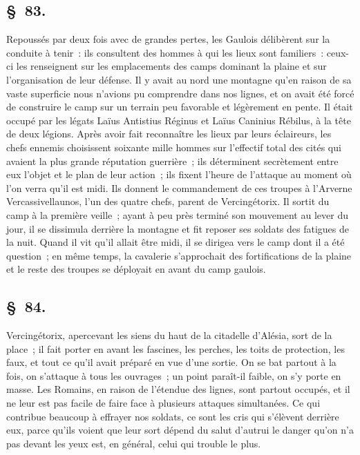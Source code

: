 \documentclass[french,twoside]{book} %
\begin{document}
\subsection[{§ 83.}]{ \textsc{§ 83.} }
\noindent Repoussés par deux fois avec de grandes pertes, les Gaulois délibèrent sur la conduite à tenir : ils consultent des hommes à qui les lieux sont familiers : ceux-ci les renseignent sur les emplacements des camps dominant la plaine et sur l’organisation de leur défense. Il y avait au nord une montagne qu’en raison de sa vaste superficie nous n’avions pu comprendre dans nos lignes, et on avait été forcé de construire le camp sur un terrain peu favorable et légèrement en pente. Il était occupé par les légats Laïus Antistius Réginus et Laïus Caninius Rébilus, à la tête de deux légions. Après avoir fait reconnaître les lieux par leurs éclaireurs, les chefs ennemis choisissent soixante mille hommes sur l’effectif total des cités qui avaient la plus grande réputation guerrière ; ils déterminent secrètement entre eux l’objet et le plan de leur action ; ils fixent l’heure de l’attaque au moment où l’on verra qu’il est midi. Ils donnent le commandement de ces troupes à l’Arverne Vercassivellaunos, l’un des quatre chefs, parent de Vercingétorix. Il sortit du camp à la première veille ; ayant à peu près terminé son mouvement au lever du jour, il se dissimula derrière la montagne et fit reposer ses soldats des fatigues de la nuit. Quand il vit qu’il allait être midi, il se dirigea vers le camp dont il a été question ; en même temps, la cavalerie s’approchait des fortifications de la plaine et le reste des troupes se déployait en avant du camp gaulois.
\subsection[{§ 84.}]{ \textsc{§ 84.} }
\noindent Vercingétorix, apercevant les siens du haut de la citadelle d’Alésia, sort de la place ; il fait porter en avant les fascines, les perches, les toits de protection, les faux, et tout ce qu’il avait préparé en vue d’une sortie. On se bat partout à la fois, on s’attaque à tous les ouvrages ; un point paraît-il faible, on s’y porte en masse. Les Romains, en raison de l’étendue des lignes, sont partout occupés, et il ne leur est pas facile de faire face à plusieurs attaques simultanées. Ce qui contribue beaucoup à effrayer nos soldats, ce sont les cris qui s’élèvent derrière eux, parce qu’ils voient que leur sort dépend du salut d’autrui le danger qu’on n’a pas devant les yeux est, en général, celui qui trouble le plus.
\end{document}
